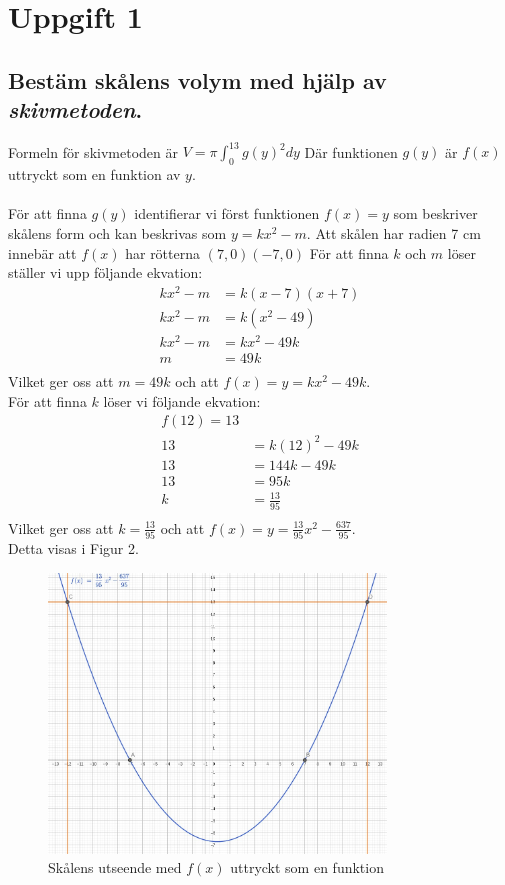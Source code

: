 \documentclass[12pt]{article}
\begin{document}
\section*{Uppgift 1}
\subsection*{Bestäm skålens volym med hjälp av {\it skivmetoden}.}
Formeln för skivmetoden är $V=\pi\int_{0}^{13}{g(y)}^2dy$
Där funktionen $g(y)$ är $f(x)$ uttryckt som en funktion av $y$.
\\\\
För att finna $g(y)$ identifierar vi först funktionen $f(x)=y$ som beskriver skålens form och kan beskrivas som $y=kx^2-m$. Att skålen har radien 7 cm innebär att $f(x)$ har rötterna $(7,0) (-7,0)$
För att finna $k$ och $m$ löser ställer vi upp följande ekvation:\\
\begin{align*}
    kx^2-m&=k(x-7)(x+7)\\
    kx^2-m&=k(x^2-49)\\
    kx^2-m&=kx^2-49k\\
    m&=49k\\
\end{align*}
\newpage
Vilket ger oss att $m=49k$ och att $f(x)=y=kx^2-49k$.\\
För att finna $k$ löser vi följande ekvation:
\begin{align*}
    f(12)=13\\
    13&=k{(12)}^2-49k\\
    13&=144k-49k\\
    13&=95k\\
    k&=\frac{13}{95}\\
\end{align*}
Vilket ger oss att $k=\frac{13}{95}$ och att $f(x)=y=\frac{13}{95}x^2-\frac{637}{95}$.
\\
Detta visas i Figur 2.
\begin{figure}[h]
    \centering
    \includegraphics[width=0.8\textwidth]{figur2.jpg}
    \caption{Skålens utseende med $f(x)$ uttryckt som en funktion}
\end{figure}
\end{document}
